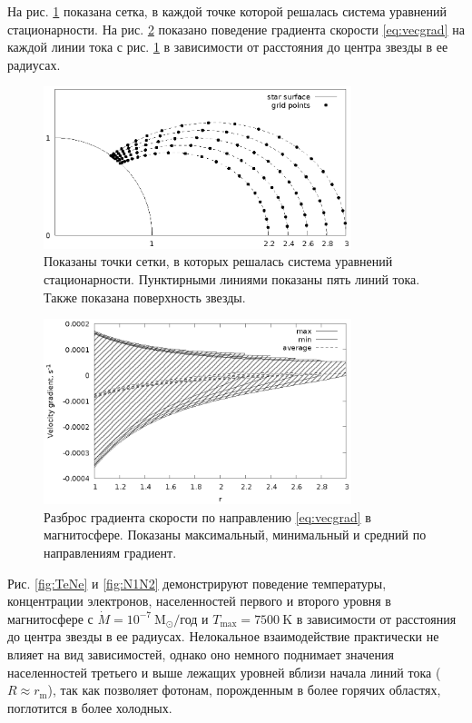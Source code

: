 \documentclass{article}
\begin{document}
На рис. \ref{fig:grid} показана сетка, в каждой точке которой решалась система уравнений стационарности. На рис. \ref{fig:grad} показано поведение градиента скорости \eqref{eq:vecgrad} на каждой линии тока с рис. \ref{fig:grid} в зависимости от расстояния до центра звезды в ее радиусах.
\begin{figure}[!h]
\centering
\includegraphics[width=0.8\textwidth]{grid.eps}
\caption{Показаны точки сетки, в которых решалась система уравнений стационарности. Пунктирными линиями показаны пять линий тока. Также показана поверхность звезды.}
\label{fig:grid}
\end{figure}
\begin{figure}[!h]
\centering
\includegraphics[width=0.8\textwidth]{grad.eps}
\caption{Разброс градиента скорости по направлению \eqref{eq:vecgrad} в магнитосфере. Показаны максимальный, минимальный и средний по направлениям градиент.}
\label{fig:grad}
\end{figure}

\FloatBarrier

Рис. \ref{fig:TeNe} и \ref{fig:N1N2} демонстрируют поведение температуры, концентрации электронов, населенностей первого и второго уровня в магнитосфере с $\dot{M} = 10^{-7}\ \text{M}_\odot/$год и $T_\text{max} = 7500\ \text{K}$ в зависимости от расстояния до центра звезды в ее радиусах. Нелокальное взаимодействие практически не влияет на вид зависимостей, однако оно немного поднимает значения населенностей третьего и выше лежащих уровней вблизи начала линий тока ($R \approx r_\text{m}$), так как позволяет фотонам, порожденным в более горячих областях, поглотится в более холодных.
\end{document}
